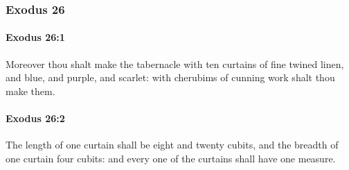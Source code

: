 	\subsubsection{Exodus 26} %
		\label{EXODUS-26}

		\paragraph{Exodus 26:1} %
			\label{EXODUS-26-1}

			Moreover thou shalt make the tabernacle with ten curtains of fine twined linen, and blue, and purple, and scarlet: with cherubims of cunning work shalt thou make them.


		\paragraph{Exodus 26:2} %
			\label{EXODUS-26-2}

			The length of one curtain shall be eight and twenty cubits, and the breadth of one curtain four cubits: and every one of the curtains shall have one measure.

